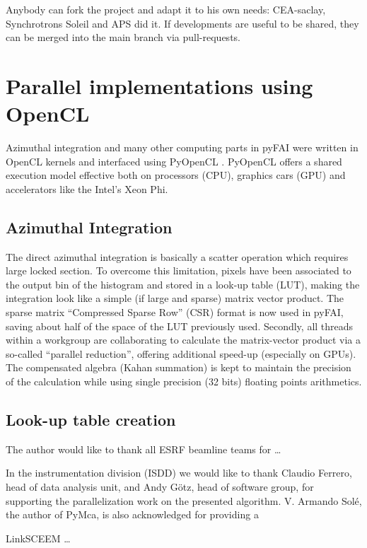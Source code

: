 \documentclass[preprint]{iucr}
\begin{document}
Anybody can fork the project and adapt it to his own needs: CEA-saclay,
Synchrotrons Soleil and APS did it. If developments are useful to be shared,
they can be merged into the main branch via pull-requests.

\section{Parallel implementations using OpenCL}
Azimuthal integration and many other computing parts in pyFAI were written in
OpenCL kernels and interfaced using PyOpenCL \cite{pyopencl}. PyOpenCL offers a
shared execution model effective both on processors (CPU), graphics cars (GPU)
and accelerators like the Intel's Xeon Phi.

\subsection{Azimuthal Integration}
The direct azimuthal integration is basically a scatter operation which
requires large locked section.
To overcome this limitation, pixels have been
associated to the output bin of the histogram and stored in a look-up
table (LUT), making the integration look like a simple (if large and sparse)
matrix vector product.
The sparse matrix ``Compressed Sparse Row'' (CSR) format is now used in pyFAI,
saving about half of the space of the LUT previously used.
Secondly, all threads within a workgroup are collaborating to calculate the
matrix-vector product via a so-called ``parallel reduction'', offering
additional speed-up (especially on GPUs).
The compensated algebra (Kahan summation) is kept to maintain the precision
of the calculation while using single precision (32 bits) floating points
arithmetics.

\subsection{Look-up table creation}



The author would like to thank all ESRF beamline teams for \ldots

In the instrumentation division (ISDD) we would like to thank Claudio Ferrero,
head of data analysis unit, and Andy G\"otz, head of software group, for
supporting the parallelization work on the presented algorithm.
V. Armando Solé, the author of PyMca, is also acknowledged for providing a

LinkSCEEM \ldots
\end{document}
